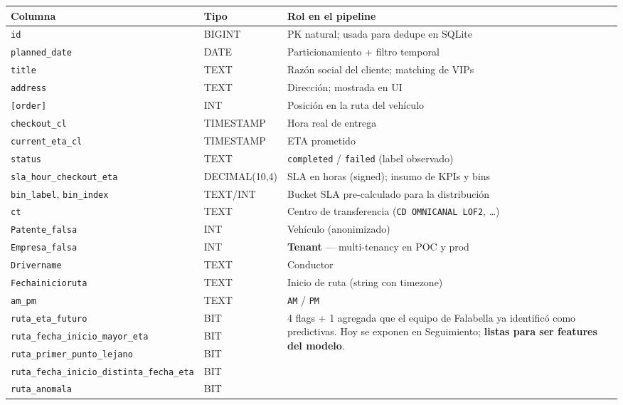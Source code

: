 \documentclass[11pt,a4paper]{article}
\begin{document}
\begin{longtable}{p{4.4cm} p{2.3cm} p{8cm}}
\toprule
\textbf{Columna} & \textbf{Tipo} & \textbf{Rol en el pipeline} \\
\midrule
\endhead
\texttt{id} & BIGINT & PK natural; usada para dedupe en SQLite \\
\texttt{planned\_date} & DATE & Particionamiento + filtro temporal \\
\texttt{title} & TEXT & Razón social del cliente; matching de VIPs \\
\texttt{address} & TEXT & Dirección; mostrada en UI \\
\texttt{[order]} & INT & Posición en la ruta del vehículo \\
\texttt{checkout\_cl} & TIMESTAMP & Hora real de entrega \\
\texttt{current\_eta\_cl} & TIMESTAMP & ETA prometido \\
\texttt{status} & TEXT & \texttt{completed} / \texttt{failed} (label observado) \\
\texttt{sla\_hour\_checkout\_eta} & DECIMAL(10,4) & SLA en horas (signed); insumo de KPIs y bins \\
\texttt{bin\_label}, \texttt{bin\_index} & TEXT/INT & Bucket SLA pre-calculado para la distribución \\
\texttt{ct} & TEXT & Centro de transferencia (\texttt{CD OMNICANAL LOF2}, \dots) \\
\texttt{Patente\_falsa} & INT & Vehículo (anonimizado) \\
\texttt{Empresa\_falsa} & INT & \textbf{Tenant} --- multi-tenancy en POC y prod \\
\texttt{Drivername} & TEXT & Conductor \\
\texttt{Fechainicioruta} & TEXT & Inicio de ruta (string con timezone) \\
\texttt{am\_pm} & TEXT & \texttt{AM} / \texttt{PM} \\
\texttt{ruta\_eta\_futuro} & BIT & \multirow{4}{*}{\parbox{8cm}{4 flags + 1 agregada que el equipo de Falabella ya identificó como predictivas. Hoy se exponen en Seguimiento; \textbf{listas para ser features del modelo}.}} \\
\texttt{ruta\_fecha\_inicio\_mayor\_eta} & BIT & \\
\texttt{ruta\_primer\_punto\_lejano} & BIT & \\
\texttt{ruta\_fecha\_inicio\_distinta\_fecha\_eta} & BIT & \\
\texttt{ruta\_anomala} & BIT & \\
\bottomrule
\end{longtable}
\end{document}
